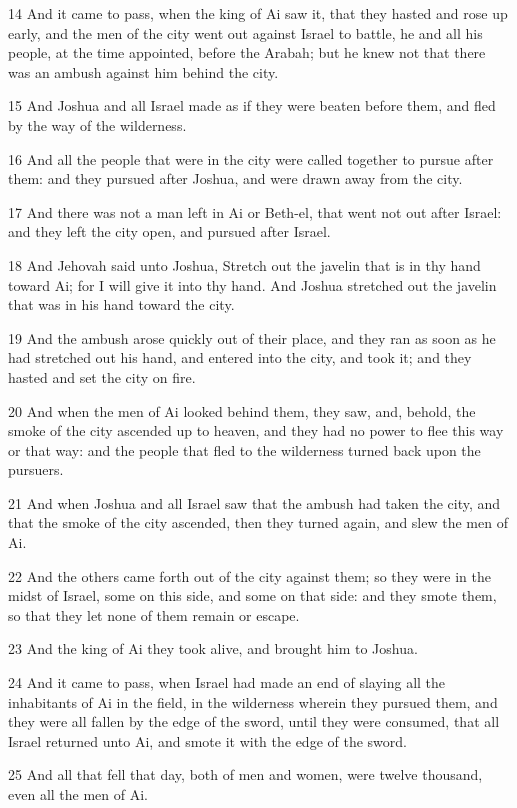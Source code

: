 \par 14 And it came to pass, when the king of Ai saw it, that they hasted and rose up early, and the men of the city went out against Israel to battle, he and all his people, at the time appointed, before the Arabah; but he knew not that there was an ambush against him behind the city.
\par 15 And Joshua and all Israel made as if they were beaten before them, and fled by the way of the wilderness.
\par 16 And all the people that were in the city were called together to pursue after them: and they pursued after Joshua, and were drawn away from the city.
\par 17 And there was not a man left in Ai or Beth-el, that went not out after Israel: and they left the city open, and pursued after Israel.
\par 18 And Jehovah said unto Joshua, Stretch out the javelin that is in thy hand toward Ai; for I will give it into thy hand. And Joshua stretched out the javelin that was in his hand toward the city.
\par 19 And the ambush arose quickly out of their place, and they ran as soon as he had stretched out his hand, and entered into the city, and took it; and they hasted and set the city on fire.
\par 20 And when the men of Ai looked behind them, they saw, and, behold, the smoke of the city ascended up to heaven, and they had no power to flee this way or that way: and the people that fled to the wilderness turned back upon the pursuers.
\par 21 And when Joshua and all Israel saw that the ambush had taken the city, and that the smoke of the city ascended, then they turned again, and slew the men of Ai.
\par 22 And the others came forth out of the city against them; so they were in the midst of Israel, some on this side, and some on that side: and they smote them, so that they let none of them remain or escape.
\par 23 And the king of Ai they took alive, and brought him to Joshua.
\par 24 And it came to pass, when Israel had made an end of slaying all the inhabitants of Ai in the field, in the wilderness wherein they pursued them, and they were all fallen by the edge of the sword, until they were consumed, that all Israel returned unto Ai, and smote it with the edge of the sword.
\par 25 And all that fell that day, both of men and women, were twelve thousand, even all the men of Ai.
